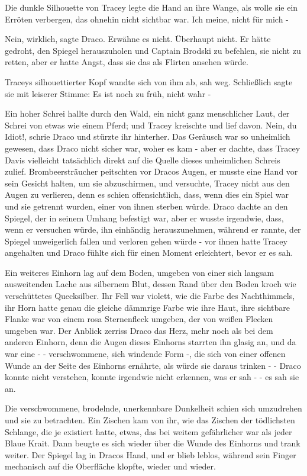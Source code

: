 Die dunkle Silhouette von Tracey legte die Hand an ihre Wange, als wolle sie ein
Erröten verbergen, das ohnehin nicht sichtbar war. \glqq{}Ich meine, nicht
für mich -\grqq{}

\glqq{}Nein, wirklich\grqq{}, sagte Draco. \glqq{}Erwähne es nicht. Überhaupt
nicht.\grqq{} Er hätte gedroht, den Spiegel herauszuholen und Captain Brodski zu
befehlen, sie nicht zu retten, aber er hatte Angst, dass sie das als Flirten
ansehen würde.

Traceys silhouettierter Kopf wandte sich von ihm ab, sah weg. Schließlich sagte
sie mit leiserer Stimme: \glqq{}Es ist noch zu früh, nicht wahr -\grqq{}

Ein hoher Schrei hallte durch den Wald, ein nicht ganz menschlicher Laut, der
Schrei von etwas wie einem Pferd; und Tracey kreischte und lief davon.
\glqq{}Nein, du Idiot!\grqq{}, schrie Draco und stürzte ihr hinterher. Das
Geräusch war so unheimlich gewesen, dass Draco nicht sicher war, woher es
kam - aber er dachte, dass Tracey Davis vielleicht tatsächlich direkt auf
die Quelle dieses unheimlichen Schreis zulief. Brombeersträucher
peitschten vor Dracos Augen, er musste eine Hand vor sein Gesicht halten,
um sie abzuschirmen, und versuchte, Tracey nicht aus den Augen zu
verlieren, denn es schien offensichtlich, dass, wenn dies ein Spiel war
und sie getrennt wurden, einer von ihnen sterben würde. Draco dachte an
den Spiegel, der in seinem Umhang befestigt war, aber er wusste
irgendwie, dass, wenn er versuchen würde, ihn einhändig herauszunehmen,
während er rannte, der Spiegel unweigerlich fallen und verloren gehen
würde - vor ihnen hatte Tracey angehalten und Draco fühlte sich für einen
Moment erleichtert, bevor er es sah.

Ein weiteres Einhorn lag auf dem Boden, umgeben von einer sich langsam
ausweitenden Lache aus silbernem Blut, dessen Rand über den Boden kroch
wie verschüttetes Quecksilber. Ihr Fell war violett, wie die Farbe des
Nachthimmels, ihr Horn hatte genau die gleiche dämmrige Farbe wie ihre
Haut, ihre sichtbare Flanke war von einem rosa Sternenfleck umgeben, der
von weißen Flecken umgeben war. Der Anblick zerriss Draco das Herz, mehr
noch als bei dem anderen Einhorn, denn die Augen dieses Einhorns starrten
ihn glasig an, und da war eine - - verschwommene, sich windende Form -,
die sich von einer offenen Wunde an der Seite des Einhorns ernährte, als
würde sie daraus trinken - - Draco konnte nicht verstehen, konnte
irgendwie nicht erkennen, was er sah - - es sah sie an.

Die verschwommene, brodelnde, unerkennbare Dunkelheit schien sich umzudrehen und
sie zu betrachten. Ein Zischen kam von ihr, wie das Zischen der
tödlichsten Schlange, die je existiert hatte, etwas, das bei weitem
gefährlicher war als jeder Blaue Krait. Dann beugte es sich wieder über
die Wunde des Einhorns und trank weiter. Der Spiegel lag in Dracos Hand,
und er blieb leblos, während sein Finger mechanisch auf die Oberfläche
klopfte, wieder und wieder.

